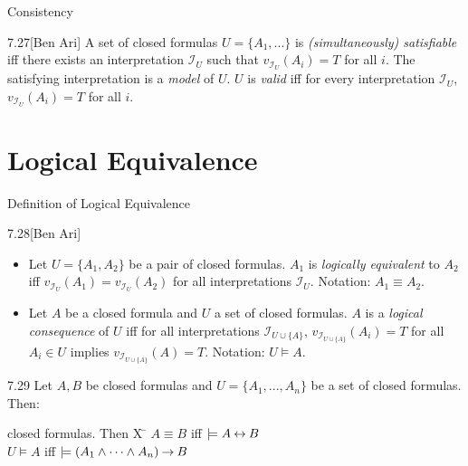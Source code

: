 \documentclass[style=sailor,size=12pt]{powerdot}
\begin{document}
\begin{wideslide}[bm=,toc=]{Consistency}
\begin{defn}{7.27}[Ben Ari]
A set of closed formulas $U = \{A_1,...\}$ is \emph{(simultaneously)
  satisfiable} iff there exists an interpretation $\mathcal{I}_U$ such that
  $v_{\mathcal{I}_U}(A_i) = T$ for all $i$. The satisfying interpretation
  is a \emph{model} of $U$. $U$ is \emph{valid} iff for every interpretation
  $\mathcal{I}_U$, $v_{\mathcal{I}_U}(A_i) = T$ for all $i$.
\end{defn}

\end{wideslide}

\section[slide=false]{Logical Equivalence}

\begin{wideslide}[bm=,toc=]{Definition of Logical Equivalence}
\begin{defn}{7.28}[Ben Ari]
\end{defn}
\vspace{-2ex}
\begin{itemize}
\item Let $U = \{A_1,A_2\}$ be a pair of closed formulas. $A_1$ is
\emph{logically equivalent} to $A_2$ iff $v_{{\mathcal{I}_U}}(A_1) =
v_{{\mathcal{I}_U}}(A_2)$ for all interpretations $\mathcal{I}_U$.
Notation: $A_1 \equiv A_2$.
\item Let $A$ be a closed formula and $U$ a set of closed formulas.
$A$ is a \emph{logical consequence} of $U$ iff for all interpretations
$\mathcal{I}_{U \cup \{A\}}$, $v_{\mathcal{I}_{U \cup \{A\}}}(A_i) = T$ for
all $A_i \in U$ implies $v_{\mathcal{I}_{U \cup \{A\}}}(A) = T$. Notation: $U \models A$.
\end{itemize}
\begin{thm}{7.29}
Let $A,B$ be closed formulas and $U = \{A_1,...,A_n\}$ be a set of
closed formulas. Then:
\end{thm}
\vspace{-5ex}
\begin{tabbing}
closed formulas. Then X \= \kill
\> $A \equiv B$ iff $\models A \mathbin{\leftrightarrow} B$\\
\> $U \models A$ iff $\models (A_1 \land \cdots \land A_n) \mathbin{\rightarrow} B$
\end{tabbing}

\end{wideslide}
\end{document}

